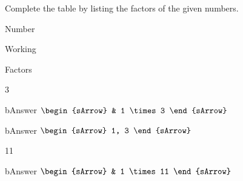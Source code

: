 \begin{mtask}[resume]
\task Complete the table by listing the factors of the given numbers.
    \begin{tcbraster}[raster columns=8,
	                  raster column skip=-0.2pt,
					  colback=white,
					  sharp corners,
					  boxrule=0.3pt,
					  after skip=-0.1pt,
					  raster row skip=-0.1pt,
					  raster height=6cm,
    				  ]
	\begin{tcolorbox}\begin{center}Number\end{center}\end{tcolorbox}
	\begin{tcolorbox}[raster multicolumn=4]\begin{center}Working\end{center}\end{tcolorbox}
	\begin{tcolorbox}[raster multicolumn=3]\begin{center}Factors\end{center}\end{tcolorbox}
	\begin{tcolorbox}3\end{tcolorbox}
	\begin{tcolorbox}[raster multicolumn=4]
	    \begin{envCell}{bAnswer}
			 $\begin{sArrow}
                      & 1  \times 3            
				  \end{sArrow}$	
	    \end{envCell}
    \end{tcolorbox}
    \begin{tcolorbox}[raster multicolumn=3]
	    \begin{envCell}{bAnswer}
			 $\begin{sArrow}
 			          1, 3           
				  \end{sArrow}$	
	    \end{envCell}
    \end{tcolorbox}
	\begin{tcolorbox}11\end{tcolorbox}
	\begin{tcolorbox}[raster multicolumn=4]
	    \begin{envCell}{bAnswer}
			 $\begin{sArrow}
                      & 1  \times 11            
				  \end{sArrow}$	
	    \end{envCell}

\end{tcolorbox}
\end{tcbraster}
\end{mtask}
